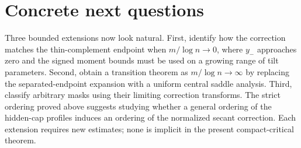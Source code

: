 \documentclass[11pt,oneside]{article}
\theoremstyle{remark}\newtheorem{remark}[theorem]{Remark}
\numberwithin{equation}{section}
\begin{document}
\section{Concrete next questions}
Three bounded extensions now look natural.
First, identify how the correction matches the thin-complement endpoint
when $m/\log n\to0$, where $y_-$ approaches zero and the signed moment
bounds must be used on a growing range of tilt parameters.
Second, obtain a transition theorem as $m/\log n\to\infty$ by replacing
the separated-endpoint expansion with a uniform central saddle analysis.
Third, classify arbitrary masks using their limiting correction transforms.
The strict ordering proved above suggests studying whether a general
ordering of the hidden-cap profiles induces an ordering of the normalized
secant correction. Each extension requires new estimates; none is implicit
in the present compact-critical theorem.
\end{document}
